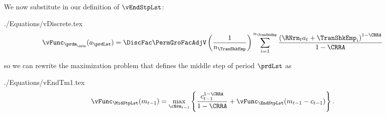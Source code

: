 \documentclass[\econtexRoot/SolvingMicroDSOPs]{subfiles}
\begin{document}
We now substitute in our definition of $\vEndStpLst$:
\begin{verbatimwrite}{./Equations/vDiscrete.tex}
  \begin{equation}\begin{gathered}\begin{aligned}
        \vFunc_{{\prdm}_\cntn}({a}_{\prdLst})  & =   \DiscFac \PermGroFacAdjV\left(\frac{1}{n_{\TranShkEmp}}\right)\sum_{i=1}^{n_{\TranShkEmp}}   \frac{\left(\RNrm_{\prd} {a}_{\prd} + \TranShkEmp_{i}\right)^{1-\CRRA}}{1-\CRRA} \label{eq:vDiscrete}
      \end{aligned}\end{gathered}\end{equation}
\end{verbatimwrite}
\unskip
so we can rewrite the maximization problem that defines the middle step of period {$\prdLst$} as %
\begin{verbatimwrite}{./Equations/vEndTm1.tex}%
  \begin{equation}\begin{gathered}\begin{aligned}
        {\vFunc}_{\MidStpLst}({m}_{\prdT-1})   & = \max_{\cNrm_{\prdT-1}}
        \left\{
          \frac{{c}_{\prdT-1}^{1-\CRRA}}{1-\CRRA} +
          \vFunc_{\EndStpLst}({m}_{\prdT-1}-{c}_{\prdT-1})
        \right\}.
        \label{eq:vEndTm1}
      \end{aligned}\end{gathered}\end{equation}%
\end{verbatimwrite}
\unskip



\begin{comment}
  In the {\SMDSOPntbk} notebook, the section ``Discretization of the Income Shock Distribution'' provides code that instantiates the \texttt{DiscreteApproximation} class defined in the \texttt{resources} module. This class creates a 7-point discretization of the continuous log-normal distribution of transitory shocks to income by utilizing seven points, where the mean value is $-.5 \sigma^2$, and the standard deviation is $\sigma = .5$.

  A close look at the \texttt{DiscreteApproximation} class and its subclasses should convince you that the code is simply a computational implementation of the mathematical description of equiprobable discrete approximation in this section. Moreover, the Python code generates a graph of the discretized distribution depicted in \ref{fig:discreteapprox}.
\end{comment}
\end{document}
